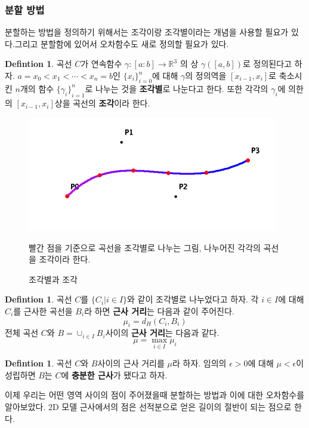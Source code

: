 \documentclass{gshs_thesis}
\theoremstyle{theorem}
\theoremstyle{lemma}
\theoremstyle{definition}
\newtheorem{definition}[theorem]{Defintion}
\begin{document}
\subsubsection{분할 방법}
분할하는 방법을 정의하기 위해서는 조각이랑 조각별이라는 개념을 사용할 필요가 있다.그리고 분할함에 있어서 오차함수도 새로 정의할 필요가 있다.
\begin{definition}
   곡선  $C$가 연속함수 $\gamma:[a:b]\rightarrow\mathbb{R}^{3}$ 의 상 $\gamma([a,b])$로 정의된다고 하자. $a=x_{0}<x_{1}<\cdots<x_{n}=b$인 ${\{x_i\}}^{n}_{i=0}$에 대해 $\gamma$의 정의역을 $[{x}_{i-1},{x}_{i}]$로 축소시킨 $n$개의 함수 ${\{{\gamma_{i}\}}^{n}_{i=1}}$로 나누는 것을 \textbf{조각별}로 나눈다고 한다. 또한 각각의 $\gamma_{i}$에 의한 의 $[{x}_{i-1},{x}_{i}]$상을 곡선의 \textbf{조각}이라 한다. 
   \begin{figure}[h]
   	\centering
   	\includegraphics[width=.5\textwidth]{image/piece}
   	\caption{조각별과 조각}
   	\small 빨간 점을 기준으로 곡선을 조각별로 나누는 그림, 나누어진 각각의 곡선을 조각이라 한다.
   \end{figure}
\end{definition}
\begin{definition}
    곡선 $C$를 $\{C_{i}|i\in{I}\}$와 같이 조각별로 나누었다고 하자. 각 $i\in{I}$에 대해 $C_{i}$를 근사한 곡선을 $B_{i}$라 하면 \textbf{근사 거리}는 다음과 같이 주어진다.
     \begin{equation}
     	\mu_{i}=d_{H}(C_{i},B_{i})
     \end{equation}
   전체 곡선 $C$와  $B=\cup_{i\in{I}}B_{i}$사이의 \textbf{근사 거리}는 다음과 같다.
     \begin{equation}
   	    \mu=\max_{i\in{I}}\mu_{i}
     \end{equation}
\end{definition}
\begin{definition}
	곡선 $C$와  $B$사이의 근사 거리를 $\mu$라 하자. 임의의 $\epsilon>0$에 대해 $\mu<\epsilon$이 성립하면 $B$는 $C$에 \textbf{충분한 근사}가 됐다고 하자.
\end{definition}
이제 우리는 어떤 영역 사이의 점이 주어졌을때 분할하는 방법과 이에 대한 오차함수를 알아보았다. 2D 모델 근사에서의 점은 선적분으로 얻은 길이의 절반이 되는 점으로 한다. 
\end{document}

